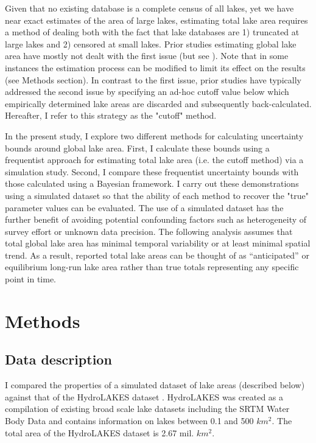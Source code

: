 \documentclass{article}
\begin{document}
Given that no existing database is a complete census of all lakes, yet we have near exact estimates of the area of large lakes, estimating total lake area requires a method of dealing both with the fact that lake databases are 1) truncated at large lakes and 2) censored at small lakes. Prior studies estimating global lake area have mostly not dealt with the first issue (but see \citet{seekell2011does}). Note that in some instances the estimation process can be modified to limit its effect on the results (see Methods section). In contrast to the first issue, prior studies have typically addressed the second issue by specifying an ad-hoc cutoff value below which empirically determined lake areas are discarded and subsequently back-calculated. Hereafter, I refer to this strategy as the "cutoff" method.

In the present study, I explore two different methods for calculating uncertainty bounds around global lake area. First, I calculate these bounds using a frequentist approach for estimating total lake area (i.e. the cutoff method) via a simulation study. Second, I compare these frequentist uncertainty bounds with those calculated using a Bayesian framework. I carry out these demonstrations using a simulated dataset so that the ability of each method to recover the "true" parameter values can be evaluated. The use of a simulated dataset has the further benefit of avoiding potential confounding factors such as heterogeneity of survey effort or unknown data precision. The following analysis assumes that total global lake area has minimal temporal variability or at least minimal spatial trend. As a result, reported total lake areas can be thought of as “anticipated” or equilibrium long-run lake area rather than true totals representing any specific point in time. 


\section{Methods}

\subsection{Data description}

I compared the properties of a simulated dataset of lake areas (described below) against that of the HydroLAKES dataset \citep{messagerEstimatingVolumeAge2016}. HydroLAKES was created as a compilation of existing broad scale lake datasets including the SRTM Water Body Data \citep{slater2006srtm} and contains information on lakes between 0.1 and 500 $km^2$. The total area of the HydroLAKES dataset is 2.67 mil. $km^2$.
\end{document}
